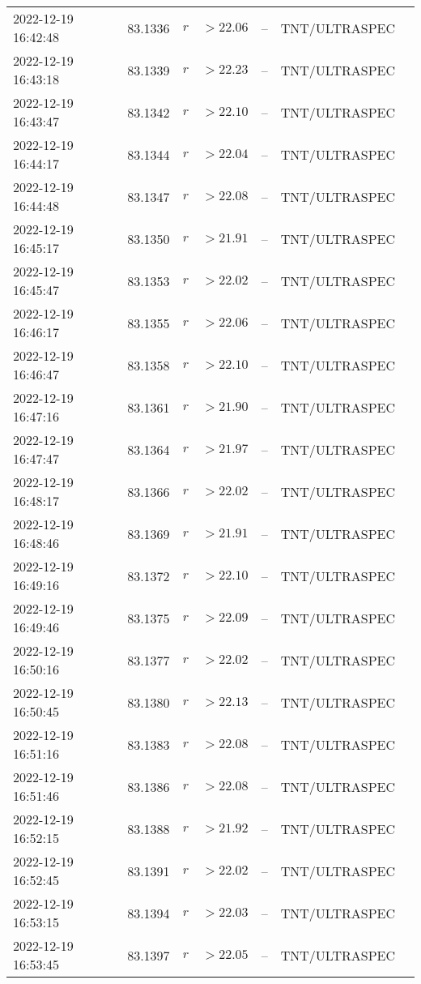 \documentclass{nature_plusfigure}
\begin{document}
\begin{supplement}
\begin{center}
\begin{longtable}{lllllll}
2022-12-19 16:42:48 & 83.1336 & $r$ & $>22.06$ & -- & TNT/ULTRASPEC &  \\ 
2022-12-19 16:43:18 & 83.1339 & $r$ & $>22.23$ & -- & TNT/ULTRASPEC &  \\ 
2022-12-19 16:43:47 & 83.1342 & $r$ & $>22.10$ & -- & TNT/ULTRASPEC &  \\ 
2022-12-19 16:44:17 & 83.1344 & $r$ & $>22.04$ & -- & TNT/ULTRASPEC &  \\ 
2022-12-19 16:44:48 & 83.1347 & $r$ & $>22.08$ & -- & TNT/ULTRASPEC &  \\ 
2022-12-19 16:45:17 & 83.1350 & $r$ & $>21.91$ & -- & TNT/ULTRASPEC &  \\ 
2022-12-19 16:45:47 & 83.1353 & $r$ & $>22.02$ & -- & TNT/ULTRASPEC &  \\ 
2022-12-19 16:46:17 & 83.1355 & $r$ & $>22.06$ & -- & TNT/ULTRASPEC &  \\ 
2022-12-19 16:46:47 & 83.1358 & $r$ & $>22.10$ & -- & TNT/ULTRASPEC &  \\ 
2022-12-19 16:47:16 & 83.1361 & $r$ & $>21.90$ & -- & TNT/ULTRASPEC &  \\ 
2022-12-19 16:47:47 & 83.1364 & $r$ & $>21.97$ & -- & TNT/ULTRASPEC &  \\ 
2022-12-19 16:48:17 & 83.1366 & $r$ & $>22.02$ & -- & TNT/ULTRASPEC &  \\ 
2022-12-19 16:48:46 & 83.1369 & $r$ & $>21.91$ & -- & TNT/ULTRASPEC &  \\ 
2022-12-19 16:49:16 & 83.1372 & $r$ & $>22.10$ & -- & TNT/ULTRASPEC &  \\ 
2022-12-19 16:49:46 & 83.1375 & $r$ & $>22.09$ & -- & TNT/ULTRASPEC &  \\ 
2022-12-19 16:50:16 & 83.1377 & $r$ & $>22.02$ & -- & TNT/ULTRASPEC &  \\ 
2022-12-19 16:50:45 & 83.1380 & $r$ & $>22.13$ & -- & TNT/ULTRASPEC &  \\ 
2022-12-19 16:51:16 & 83.1383 & $r$ & $>22.08$ & -- & TNT/ULTRASPEC &  \\ 
2022-12-19 16:51:46 & 83.1386 & $r$ & $>22.08$ & -- & TNT/ULTRASPEC &  \\ 
2022-12-19 16:52:15 & 83.1388 & $r$ & $>21.92$ & -- & TNT/ULTRASPEC &  \\ 
2022-12-19 16:52:45 & 83.1391 & $r$ & $>22.02$ & -- & TNT/ULTRASPEC &  \\ 
2022-12-19 16:53:15 & 83.1394 & $r$ & $>22.03$ & -- & TNT/ULTRASPEC &  \\ 
2022-12-19 16:53:45 & 83.1397 & $r$ & $>22.05$ & -- & TNT/ULTRASPEC &  \\ 

\end{longtable}
\end{center}
\end{supplement}
\end{document}
